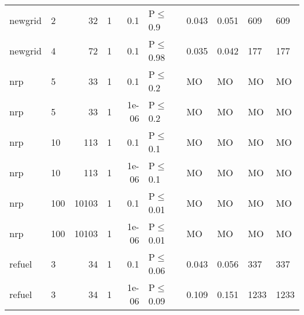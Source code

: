 \begin{longtable}{llrrrlllll}
 newgrid       & 2         &     	32 & 1 & 0.1   & P$\leq$0.9   & 0.043   & 0.051   & 609    & 609    \\
 newgrid       & 4         &     	72 & 1 & 0.1   & P$\leq$0.98  & 0.035   & 0.042   & 177    & 177    \\
 nrp           & 5         &     	33 & 1 & 0.1   & P$\leq$0.2   & MO      & MO      & MO     & MO     \\
 nrp           & 5         &     	33 & 1 & 1e-06 & P$\leq$0.2   & MO      & MO      & MO     & MO     \\
 nrp           & 10        &    	113 & 1 & 0.1   & P$\leq$0.1   & MO      & MO      & MO     & MO     \\
 nrp           & 10        &    	113 & 1 & 1e-06 & P$\leq$0.1   & MO      & MO      & MO     & MO     \\
 nrp           & 100       &  	10103 & 1 & 0.1   & P$\leq$0.01  & MO      & MO      & MO     & MO     \\
 nrp           & 100       &  	10103 & 1 & 1e-06 & P$\leq$0.01  & MO      & MO      & MO     & MO     \\
 refuel        & 3         &     	34 & 1 & 0.1   & P$\leq$0.06  & 0.043   & 0.056   & 337    & 337    \\
 refuel        & 3         &     	34 & 1 & 1e-06 & P$\leq$0.09  & 0.109   & 0.151   & 1233   & 1233   \\
\bottomrule
\end{longtable}

